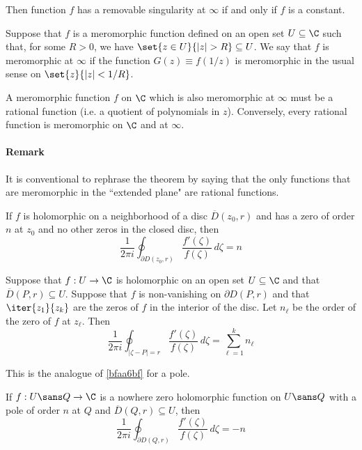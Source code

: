 Then function $f$ has a removable singularity at $\infty$ if and only if $f$ is
a constant.

\Definition{}\label{e315122}

Suppose that $f$ is a meromorphic function defined on an open set
$U\subseteq\C$ such that, for some $R>0$, we have $\set{z\in U}{|z|>R}\subseteq
U$. We say that $f$ is meromorphic at $\infty$ if the function $G(z)\equiv
f(1/z)$ is meromorphic in the usual sense on $\set{z}{|z|<1/R}$.

\Theorem{}\label{d0f6c9d}

A meromorphic function $f$ on $\C$ which is also meromorphic at $\infty$ must
be a rational function (i.e. a quotient of polynomials in $z$). Conversely,
every rational function is meromorphic on $\C$ and at $\infty$.

\paragraph{Remark}

It is conventional to rephrase the theorem by saying that the only functions
that are meromorphic in the ``extended plane" are rational functions.

\Lemma{}\label{bfaa6bf}

If $f$ is holomorphic on a neighborhood of a disc $\overline D(z_0,r)$ and has
a zero of order $n$ at $z_0$ and no other zeros in the closed disc, then
$$
  \frac1{2\pi i}\oint_{\partial D(z_0,r)}\frac{f'(\zeta)}{f(\zeta)}\,d\zeta=n
$$


\Proposition{}\label{fb7bf08}

Suppose that $f:U\to\C$ is holomorphic on an open set $U\subseteq\C$ and that
$\overline D(P,r)\subseteq U$. Suppose that $f$ is non-vanishing on $\partial
D(P,r)$ and that $\iter{z_1}{z_k}$ are the zeros of $f$ in the interior of the
disc. Let $n_\ell$ be the order of the zero of $f$ at $z_\ell$. Then
$$
  \frac1{2\pi i}\oint_{|\zeta-P|=r}\frac{f'(\zeta)}{f(\zeta)}\,d\zeta=\sum_{\ell=1}^kn_\ell
$$


\Lemma{}\label{fb96cf1}

This is the analogue of \autoref{bfaa6bf} for a pole.

If $f:U\sans Q\to\C$ is a nowhere zero holomorphic function on $U\sans Q$ with
a pole of order $n$ at $Q$ and $\overline D(Q,r)\subseteq U$, then
$$
  \frac1{2\pi i}\oint_{\partial D(Q,r)}\frac{f'(\zeta)}{f(\zeta)}\,d\zeta=-n
$$

